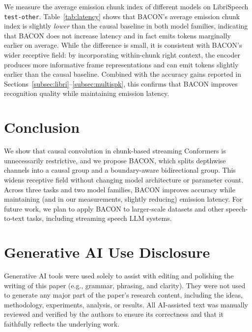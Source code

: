 \documentclass[cameraready]{Interspeech}
\begin{document}
We measure the average emission chunk index of different models on
LibriSpeech \texttt{test-other}. Table~\ref{tab:latency} shows that BACON's
average emission chunk index is
slightly \emph{lower} than the causal baseline in both model families,
indicating that BACON does not increase latency and in fact emits tokens
marginally earlier on average. 
While the difference is small, it is consistent
with BACON's wider receptive field: by incorporating within-chunk right
context, the encoder produces more informative frame representations and can
emit tokens slightly earlier than the causal baseline. Combined with
the accuracy gains reported in
Sections~\ref{subsec:libri}--\ref{subsec:multispk}, this confirms that BACON
improves recognition quality while maintaining  emission latency.

\section{Conclusion}
\label{sec:conclusion}

We show that causal convolution in chunk-based streaming Conformers is
unnecessarily restrictive, and we propose BACON, which splits depthwise
channels into a causal group and a boundary-aware bidirectional group. This
widens receptive field without changing model architecture or parameter count.
Across three tasks and two model families, BACON improves accuracy while
maintaining (and in our measurements, slightly reducing) emission latency. For
future work, we plan to apply BACON to larger-scale datasets and other
speech-to-text tasks, including streaming speech LLM systems.

\section{Generative AI Use Disclosure}
\label{sec:genai}

Generative AI tools were used solely to assist with editing and polishing the
writing of this paper (e.g., grammar, phrasing, and clarity). They were not
used to generate any major part of the paper's research content, including the
ideas, methodology, experiments, analysis, or results. All AI-assisted text was
manually reviewed and verified by the authors to ensure its correctness and that
it faithfully reflects the underlying work.



\end{document}
